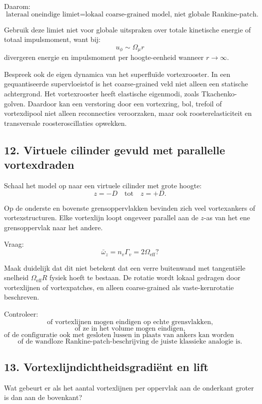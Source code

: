 \documentclass[11pt,a4paper]{article}
\begin{document}
Daarom:
\[
\boxed{
\text{lateraal oneindige limiet}
=
\text{lokaal coarse-grained model, niet globale Rankine-patch.}
}
\]

Gebruik deze limiet niet voor globale uitspraken over totale kinetische energie of totaal impulsmoment, want bij:
\[
u_{\phi}\sim\Omega_{\mu}r
\]
divergeren energie en impulsmoment per hoogte-eenheid wanneer \(r\rightarrow\infty\).

Bespreek ook de eigen dynamica van het superfluïde vortexrooster. In een gequantiseerde supervloeistof is het coarse-grained veld niet alleen een statische achtergrond. Het vortexrooster heeft elastische eigenmodi, zoals Tkachenko-golven. Daardoor kan een verstoring door een vortexring, bol, trefoil of vortexdipool niet alleen reconnecties veroorzaken, maar ook roosterelasticiteit en transversale roosteroscillaties opwekken.

\subsection{12. Virtuele cilinder gevuld met parallelle vortexdraden}

Schaal het model op naar een virtuele cilinder met grote hoogte:
\[
z=-D
\quad\text{tot}\quad
z=+D.
\]

Op de onderste en bovenste grensoppervlakken bevinden zich veel vortexankers of vortexstructuren. Elke vortexlijn loopt ongeveer parallel aan de \(z\)-as van het ene grensoppervlak naar het andere.

Vraag:
\[
\bar{\omega}_z
=
n_v\Gamma_v
=
2\Omega_{\mathrm{eff}}?
\]

Maak duidelijk dat dit niet betekent dat een verre buitenwand met tangentiële snelheid \(\Omega_{\mathrm{eff}}R\) fysiek hoeft te bestaan. De rotatie wordt lokaal gedragen door vortexlijnen of vortexpatches, en alleen coarse-grained als vaste-kernrotatie beschreven.

Controleer:
\[
\text{of vortexlijnen mogen eindigen op echte grensvlakken,}
\]
\[
\text{of ze in het volume mogen eindigen,}
\]
\[
\text{of de configuratie ook met gesloten lussen in plaats van ankers kan worden geformuleerd,}
\]
\[
\text{of de wandloze Rankine-patch-beschrijving de juiste klassieke analogie is.}
\]

\subsection{13. Vortexlijndichtheidsgradiënt en lift}

Wat gebeurt er als het aantal vortexlijnen per oppervlak aan de onderkant groter is dan aan de bovenkant?
\end{document}
